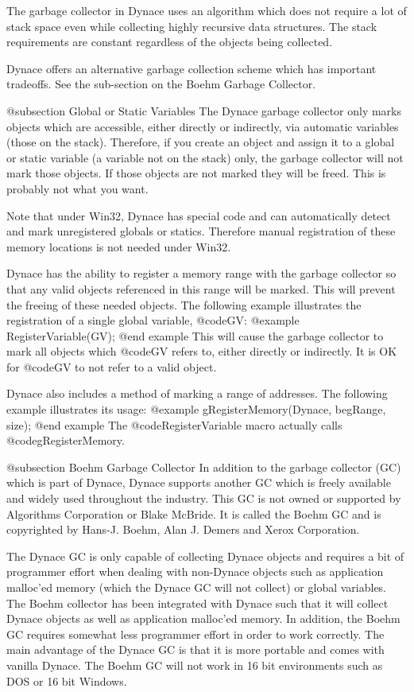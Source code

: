 The garbage collector in Dynace uses an algorithm which does not require a
lot of stack space even while collecting highly recursive data
structures.  The stack requirements are constant regardless of the
objects being collected.

Dynace offers an alternative garbage collection scheme which has important
tradeoffs.  See the sub-section on the Boehm Garbage Collector.



@subsection Global or Static Variables
The Dynace garbage collector only marks objects which are accessible, either
directly or indirectly, via automatic variables (those on the stack).
Therefore, if you create an object and assign it to a global or static
variable (a variable not on the stack) only, the garbage collector will
not mark those objects.  If those objects are not marked they will be
freed.  This is probably not what you want.

Note that under Win32, Dynace has special code and can automatically
detect and mark unregistered globals or statics.  Therefore manual
registration of these memory locations is not needed under Win32.

Dynace has the ability to register a memory range with the garbage collector
so that any valid objects referenced in this range will be marked.  This
will prevent the freeing of these needed objects.  The following example
illustrates the registration of a single global variable, @code{GV}:
@example
        RegisterVariable(GV);
@end example
This will cause the garbage collector to mark all objects which @code{GV}
refers to, either directly or indirectly.  It is OK for @code{GV} to not
refer to a valid object.

Dynace also includes a method of marking a range of addresses.  The following
example illustrates its usage:
@example
        gRegisterMemory(Dynace, begRange, size);
@end example
The @code{RegisterVariable} macro actually calls @code{gRegisterMemory}.




@subsection Boehm Garbage Collector
In addition to the garbage collector (GC) which is part of Dynace,
Dynace supports another GC which is freely available and widely used
throughout the industry.  This GC is not owned or supported by
Algorithms Corporation or Blake McBride.  It is called the Boehm GC and is
copyrighted by Hans-J. Boehm, Alan J. Demers and Xerox Corporation.

The Dynace GC is only capable of collecting Dynace objects and requires
a bit of programmer effort when dealing with non-Dynace objects such as
application malloc'ed memory (which the Dynace GC will not collect) or
global variables.  The Boehm collector has been integrated with Dynace
such that it will collect Dynace objects as well as application
malloc'ed memory.  In addition, the Boehm GC requires somewhat less
programmer effort in order to work correctly.  The main advantage of the
Dynace GC is that it is more portable and comes with vanilla Dynace.
The Boehm GC will not work in 16 bit environments such as DOS or 16 bit
Windows.

